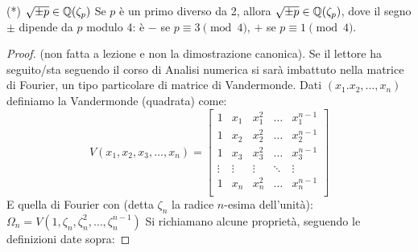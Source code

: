 \begin{theorem}{(*) $\sqrt{\pm p} \in \mathbb{Q}(\zeta_p)$}
    Se $p$ è un primo diverso da 2, allora $\sqrt{\pm p} \in \mathbb{Q}(\zeta_p)$, dove il segno $\pm$ dipende da $p$ modulo 4: è $-$ se $p \equiv 3 \pmod{4}$, $+$ se $p \equiv 1 \pmod{4}$.
\end{theorem}
\begin{proof}
    (non fatta a lezione e non la dimostrazione canonica). Se il lettore ha seguito/sta seguendo il corso di Analisi numerica si sarà imbattuto nella matrice di Fourier, un tipo particolare di matrice di Vandermonde. Dati $(x_1. x_2, \dots, x_n)$ definiamo la Vandermonde (quadrata) come:
\begin{equation*}
V(x_1, x_2, x_3, \dots, x_n) = 
\begin{bmatrix}
1 & x_1 & x_1^2 & \dots & x_1^{n-1}\\
1 & x_2 & x_2^2 & \dots & x_2^{n-1}\\
1 & x_3 & x_3^2 & \dots & x_3^{n-1}\\
\vdots & \vdots & \vdots & \ddots & \vdots \\ 
1 & x_n & x_n^2 & \dots & x_n^{n-1}\\
\end{bmatrix}
\end{equation*}
E quella di Fourier con (detta $\zeta_n$ la radice $n$-esima dell'unità): $\Omega_n = V(1,\zeta_n,\zeta_n^2,\dots, \zeta_n^{n-1})$
Si richiamano alcune proprietà, seguendo le definizioni date sopra:
\end{proof}
